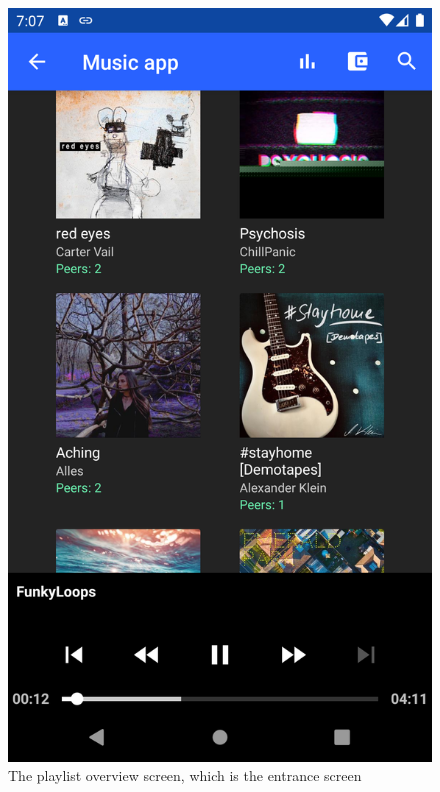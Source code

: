 \begin{figure}[]
        \includegraphics[width=1\linewidth]{implementation/overview.png}
        \caption{The playlist overview screen, which is the entrance screen}
        \label{fig:screenshot-home}
    \endminipage\hfill

\end{figure}
